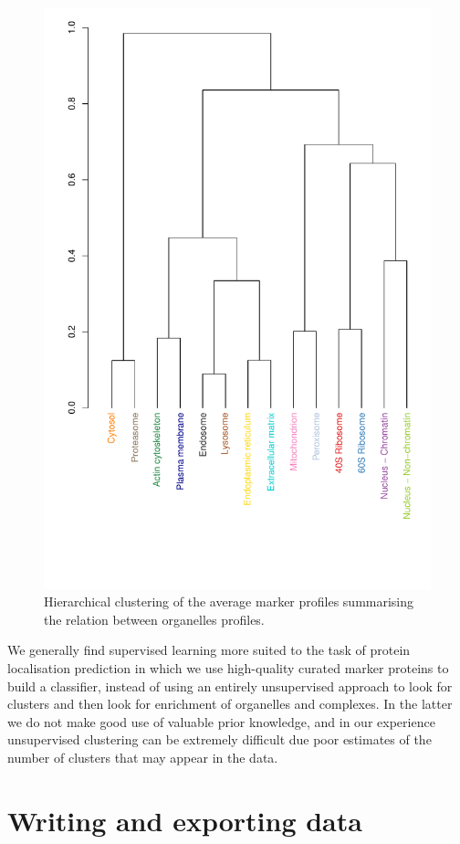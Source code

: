 \begin{figure}[!ht]
  \centering
\begin{knitrout}
\color{fgcolor}\begin{kframe}
\begin{alltt}
\hlstd{(} \hlstd{=} \hlstd{(}\hlstd{,} \hlstd{,} \hlstd{,} \hlstd{))}
\end{alltt}
\end{kframe}
\includegraphics[width=.5\textwidth,angle=-90]{figure/hclust-1} 

\end{knitrout}
  \caption{Hierarchical clustering of the average marker profiles summarising the relation between organelles profiles.}
  \label{fig:mrkHclust}
\end{figure}

We generally find supervised learning more suited to the task of
protein localisation prediction in which we use high-quality curated
marker proteins to build a classifier, instead of using an entirely
unsupervised approach to look for clusters and then look for
enrichment of organelles and complexes. In the latter we do not make
good use of valuable prior knowledge, and in our experience
unsupervised clustering can be extremely difficult due poor estimates
of the number of clusters that may appear in the data.

\section*{Writing and exporting data}

